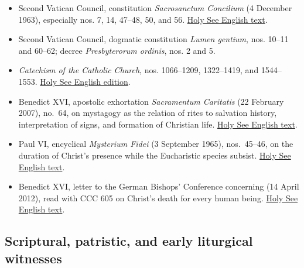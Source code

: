 \begin{itemize}
  \item Second Vatican Council, constitution \emph{Sacrosanctum Concilium} (4 December 1963), especially nos. 7, 14, 47--48, 50, and 56. \href{https://www.vatican.va/archive/hist_councils/ii_vatican_council/documents/vat-ii_const_19631204_sacrosanctum-concilium_en.html}{Holy See English text}.
  \item Second Vatican Council, dogmatic constitution \emph{Lumen gentium}, nos. 10--11 and 60--62; decree \emph{Presbyterorum ordinis}, nos. 2 and 5.
  \item \emph{Catechism of the Catholic Church}, nos. 1066--1209, 1322--1419, and 1544--1553. \href{https://www.vatican.va/archive/ENG0015/_INDEX.HTM}{Holy See English edition}.
  \item Benedict XVI, apostolic exhortation \emph{Sacramentum Caritatis} (22 February 2007), no.~64, on mystagogy as the relation of rites to salvation history, interpretation of signs, and formation of Christian life. \href{https://www.vatican.va/content/benedict-xvi/en/apost_exhortations/documents/hf_ben-xvi_exh_20070222_sacramentum-caritatis.html}{Holy See English text}.
  \item Paul VI, encyclical \emph{Mysterium Fidei} (3 September 1965), nos.~45--46, on the duration of Christ's presence while the Eucharistic species subsist. \href{https://www.vatican.va/content/paul-vi/en/encyclicals/documents/hf_p-vi_enc_03091965_mysterium.html}{Holy See English text}.
  \item Benedict XVI, letter to the German Bishops' Conference concerning  (14 April 2012), read with CCC 605 on Christ's death for every human being. \href{https://www.vatican.va/content/benedict-xvi/en/letters/2012/documents/hf_ben-xvi_let_20120414_zollitsch.html}{Holy See English text}.
\end{itemize}

\subsection{Scriptural, patristic, and early liturgical witnesses}

